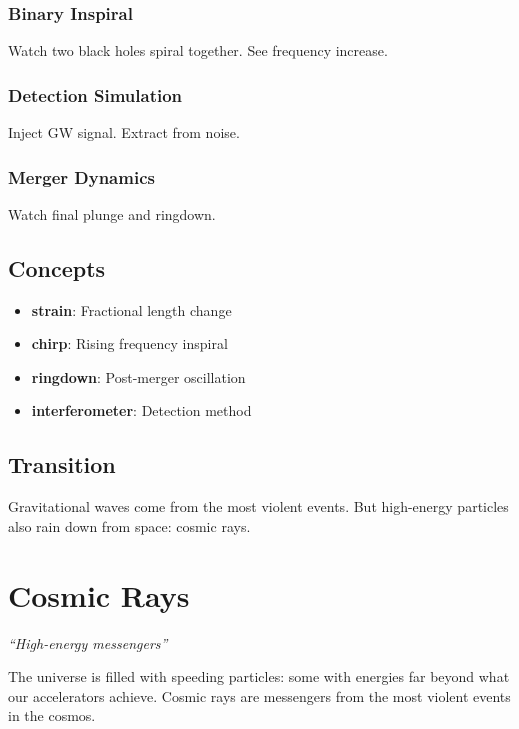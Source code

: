 \documentclass[
  11pt,
  letterpaper,
  twoside,
  openright]{book}
\providecommand{\tightlist}{%
  \setlength{\itemsep}{0pt}\setlength{\parskip}{0pt}}
\begin{document}
\subsection{Binary Inspiral}\label{binary-inspiral}

Watch two black holes spiral together. See frequency increase.

\subsection{Detection Simulation}\label{detection-simulation}

Inject GW signal. Extract from noise.

\subsection{Merger Dynamics}\label{merger-dynamics}

Watch final plunge and ringdown.

\section{Concepts}\label{concepts-33}

\begin{itemize}
\tightlist
\item
  \textbf{strain}: Fractional length change
\item
  \textbf{chirp}: Rising frequency inspiral
\item
  \textbf{ringdown}: Post-merger oscillation
\item
  \textbf{interferometer}: Detection method
\end{itemize}

\section{Transition}\label{transition-34}

Gravitational waves come from the most violent events. But high-energy
particles also rain down from space: cosmic rays.

\chapter{Cosmic Rays}\label{sec-cosmic-rays}

\emph{``High-energy messengers''}

\begin{tcolorbox}[enhanced jigsaw, coltitle=black, colbacktitle=quarto-callout-note-color!10!white, toprule=.15mm, colframe=quarto-callout-note-color-frame, arc=.35mm, opacityback=0, bottomtitle=1mm, toptitle=1mm, breakable, colback=white, titlerule=0mm, opacitybacktitle=0.6, title=\textcolor{quarto-callout-note-color}{\faInfo}\hspace{0.5em}{Key Revelation}, rightrule=.15mm, bottomrule=.15mm, leftrule=.75mm, left=2mm]

The universe is filled with speeding particles: some with energies far
beyond what our accelerators achieve. Cosmic rays are messengers from
the most violent events in the cosmos.

\end{tcolorbox}
\end{document}
